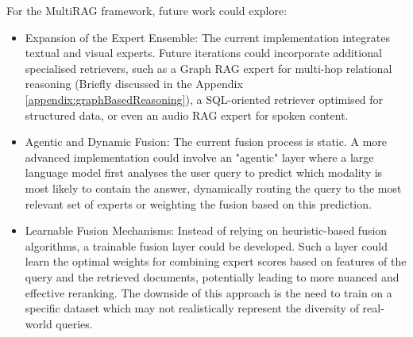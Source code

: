 \documentclass[12pt,twoside]{report}
\begin{document}
For the MultiRAG framework, future work could explore:
\begin{itemize}
\item{Expansion of the Expert Ensemble}: The current implementation integrates textual and visual experts. Future iterations could incorporate additional specialised retrievers, such as a Graph RAG expert for multi-hop relational reasoning (Briefly discussed in the Appendix \ref{appendix:graphBasedReasoning}), a SQL-oriented retriever optimised for structured data, or even an audio RAG expert\cite{WavRAG} for spoken content.

\item{Agentic and Dynamic Fusion}: The current fusion process is static. A more advanced implementation could involve an "agentic" layer where a large language model first analyses the user query to predict which modality is most likely to contain the answer, dynamically routing the query to the most relevant set of experts or weighting the fusion based on this prediction.

\item{Learnable Fusion Mechanisms}: Instead of relying on heuristic-based fusion algorithms, a trainable fusion layer could be developed. Such a layer could learn the optimal weights for combining expert scores based on features of the query and the retrieved documents, potentially leading to more nuanced and effective reranking. The downside of this approach is the need to train on a specific dataset which may not realistically represent the diversity of real-world queries.
\end{itemize}
\end{document}
